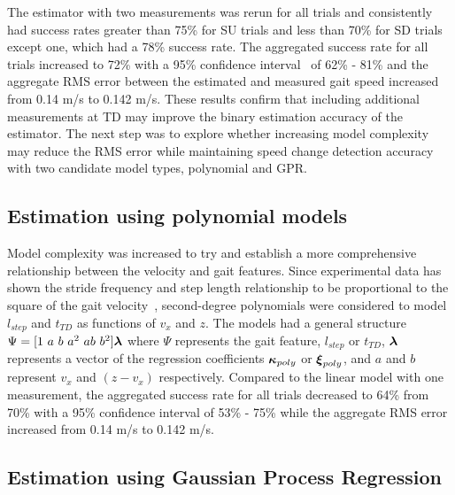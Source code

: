 The estimator with two measurements was rerun for all trials and consistently had success rates greater than 75\% for SU trials and less than 70\% for SD trials except one, which had a 78\% success rate. The aggregated success rate for all trials increased to  72\% with a 95\% confidence interval~\cite{brown2001interval} of 62\% - 81\% and the aggregate RMS error between the estimated and measured gait speed increased from 0.14 m/s to 0.142 m/s.  These results confirm that including additional measurements at TD may improve the binary estimation accuracy of the estimator. The next step was to explore whether increasing model complexity may reduce the RMS error while maintaining speed change detection accuracy with two candidate model types, polynomial and GPR.

\subsection{Estimation using polynomial models}

Model complexity was increased to try and establish a more comprehensive relationship between the velocity and gait features. Since experimental data has shown the stride frequency and step length relationship to be proportional to the square of the gait velocity~\cite{bailey2017relationship}, second-degree polynomials were considered to model $ l_{step} $ and $ t_{TD} $ as functions of $ v_x $ and $ z $. The models had a general structure $ \Psi = [1\ a\ b\ a^2\ ab\ b^2 ] \greekvec{\lambda}$ where $ \Psi $ represents the gait feature, $ l_{step} $ or $ t_{TD} $, $ \boldsymbol{\lambda} $ represents a vector of the regression coefficients $ \boldsymbol{\kappa}_{poly} $ or $ \boldsymbol{\xi}_{poly} $, and $ a $ and $ b $ represent $v_x$ and $(z - v_x) $ respectively. Compared to the linear model with one measurement, the aggregated success rate for all trials decreased to  64\% from 70\% with a 95\% confidence interval of 53\% - 75\% while the aggregate RMS error increased from 0.14 m/s to 0.142 m/s.

\subsection{Estimation using Gaussian Process Regression}

